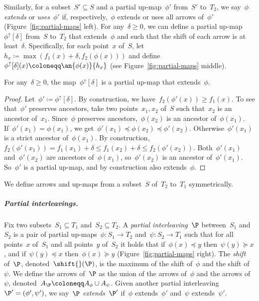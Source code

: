 Similarly, for a subset~$S' \subseteq S$ and a partial up-map~$\phi'$ from~$S'$ to~$T_2$, we say~$\phi$ \emph{extends} or \emph{uses}~$\phi'$ if, respectively,~$\phi$ extends or uses all arrows of~$\phi'$ (Figure~\ref{fig:partial-maps} left).
%
For any~$\delta \ge 0$, we can define a partial up-map~$\phi^\uparrow[\delta]$ from~$S$ to~$T_2$ that extends~$\phi$ and such that the shift of each arrow is at least~$\delta$.
Specifically, for each point~$x$ of~$S$, let~$h_x \coloneqq \max(f_1(x) +\delta, f_2(\phi(x)))$ and define~$\phi^\uparrow[\delta](x) \coloneqq \an{\phi(x)}{h_x}$ (see Figure~\ref{fig:partial-maps} middle).
%
\begin{lemma}\label{lem:lifted}
	For any~$\delta \ge 0$, the map~$\phi^\uparrow[\delta]$ is a partial up-map that extends~$\phi$.
\end{lemma}
\begin{proof}
    Let~$\phi' \coloneqq \phi^\uparrow[\delta]$.
    By construction, we have~$f_2(\phi'(x)) \ge f_1(x)$.
	To see that~$\phi'$ preserves ancestors, take two points~$x_1, x_2$ of~$S$ such that~$x_2$ is an ancestor of~$x_1$.
	Since~$\phi$ preserves ancestors,~$\phi(x_2)$ is an ancestor of~$\phi(x_1)$.
	If~$\phi'(x_1) = \phi(x_1)$, we get~${\phi'(x_1) \preceq \phi(x_2) \preceq \phi'(x_2)}$.
	Otherwise~$\phi'(x_1)$ is a strict ancestor of~$\phi(x_1)$.
	By construction,~$f_2(\phi'(x_1)) = f_1(x_1) + \delta \le f_1(x_2) + \delta \le f_2(\phi'(x_2))$.
	Both~$\phi'(x_1)$ and~$\phi'(x_2)$ are ancestors of~$\phi(x_1)$, so~$\phi'(x_2)$ is an ancestor of~$\phi'(x_1)$.
	So~$\phi'$ is a partial up-map, and by construction also extends~$\phi$.
\end{proof}
%
\noindent
We define arrows and up-maps from a subset~$S$ of~$T_2$ to~$T_1$ symmetrically.
%
\subparagraph{Partial interleavings.}
Fix two subsets~$S_1 \subseteq T_1$ and~$S_2 \subseteq T_2$.
A \emph{partial interleaving}~$\P$ between~$S_1$ and~$S_2$ is a pair of partial up-maps~$\phi \colon S_1 \to T_2$ and~$\psi \colon S_2 \to T_1$ such that for all points~$x$ of~$S_1$ and all points~$y$ of~$S_2$ it holds that if~$\phi(x) \preceq y$ then~$\psi(y) \succeq x$, and if~$\psi(y) \preceq x$ then~$\phi(x) \succeq y$ (Figure~\ref{fig:partial-maps} right).
The \emph{shift} of~$\P$, denoted~$\shift{}(\P)$, is the maximum of the shift of~$\phi$ and the shift of~$\psi$.
We define the arrows of~$\P$ as the union of the arrows of~$\phi$ and the arrows of~$\psi$, denoted~$A_\P \coloneqq A_\phi \cup A_\psi$.
Given another partial interleaving~$\P' = (\phi', \psi')$, we say~$\P$ \emph{extends}~$\P'$ if~$\phi$ extends~$\phi'$ and~$\psi$ extends~$\psi'$.
